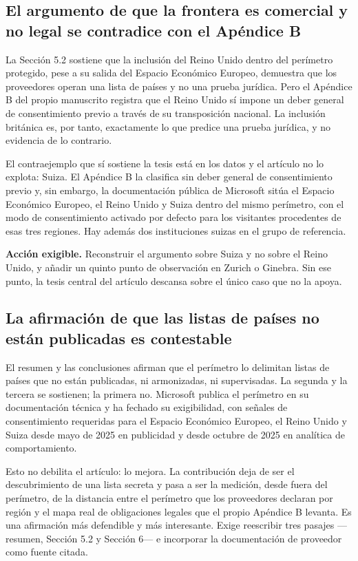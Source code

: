 \documentclass[11pt,a4paper]{article}
\begin{document}
\subsection{El argumento de que la frontera es comercial y no legal se contradice con el Ap\'endice B}

La Secci\'on 5.2 sostiene que la inclusi\'on del Reino Unido dentro del per\'imetro protegido, pese a su salida del Espacio Econ\'omico Europeo, demuestra que los proveedores operan una lista de pa\'ises y no una prueba jur\'idica. Pero el Ap\'endice B del propio manuscrito registra que el Reino Unido s\'i impone un deber general de consentimiento previo a trav\'es de su transposici\'on nacional. La inclusi\'on brit\'anica es, por tanto, exactamente lo que predice una prueba jur\'idica, y no evidencia de lo contrario.

El contraejemplo que s\'i sostiene la tesis est\'a en los datos y el art\'iculo no lo explota: Suiza. El Ap\'endice B la clasifica sin deber general de consentimiento previo y, sin embargo, la documentaci\'on p\'ublica de Microsoft sit\'ua el Espacio Econ\'omico Europeo, el Reino Unido y Suiza dentro del mismo per\'imetro, con el modo de consentimiento activado por defecto para los visitantes procedentes de esas tres regiones. Hay adem\'as dos instituciones suizas en el grupo de referencia.

\textbf{Acci\'on exigible.} Reconstruir el argumento sobre Suiza y no sobre el Reino Unido, y a\~nadir un quinto punto de observaci\'on en Zurich o Ginebra. Sin ese punto, la tesis central del art\'iculo descansa sobre el \'unico caso que no la apoya.

\subsection{La afirmaci\'on de que las listas de pa\'ises no est\'an publicadas es contestable}

El resumen y las conclusiones afirman que el per\'imetro lo delimitan listas de pa\'ises que no est\'an publicadas, ni armonizadas, ni supervisadas. La segunda y la tercera se sostienen; la primera no. Microsoft publica el per\'imetro en su documentaci\'on t\'ecnica y ha fechado su exigibilidad, con se\~nales de consentimiento requeridas para el Espacio Econ\'omico Europeo, el Reino Unido y Suiza desde mayo de 2025 en publicidad y desde octubre de 2025 en anal\'itica de comportamiento.

Esto no debilita el art\'iculo: lo mejora. La contribuci\'on deja de ser el descubrimiento de una lista secreta y pasa a ser la medici\'on, desde fuera del per\'imetro, de la distancia entre el per\'imetro que los proveedores declaran por regi\'on y el mapa real de obligaciones legales que el propio Ap\'endice B levanta. Es una afirmaci\'on m\'as defendible y m\'as interesante. Exige reescribir tres pasajes ---resumen, Secci\'on 5.2 y Secci\'on 6--- e incorporar la documentaci\'on de proveedor como fuente citada.
\end{document}
